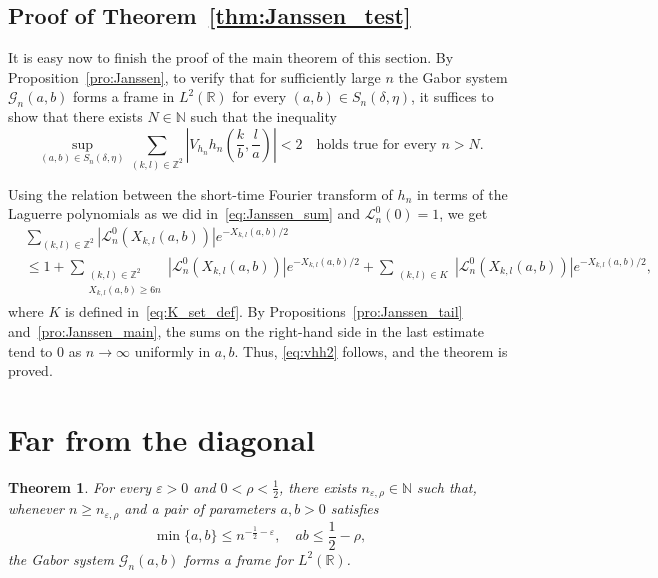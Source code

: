 \documentclass[11pt]{amsart}
\numberwithin{equation}{section}
\newtheorem{theorem}{Theorem}[section]
\newcommand{\R}{{\mathbb R}}
\newcommand{\Z}{{\mathbb Z}}
\newcommand{\N}{{\mathbb N}}
\begin{document}
\subsection{Proof of Theorem~\ref{thm:Janssen_test}}

It is easy now to finish the proof of the main theorem of this section.
By Proposition~\ref{pro:Janssen}, to verify that for sufficiently large $n$ the Gabor system $\mathcal{G}_n(a,b)$ forms a frame in $L^2(\R)$ for every $(a,b) \in S_n(\delta,\eta)$, it suffices to show that there exists $N\in\N$ such that the inequality
\begin{equation}\label{eq:vhh2}
    \sup\limits_{(a,b)\in S_n(\delta, \eta)} \sum_{(k,l)\in \Z^2} \left|V_{h_n} h_n \left( \frac{k}{b},\frac{l}{a} \right) \right| < 2 \quad \text{holds true for every $n>N$.}
\end{equation}

Using the relation between the short-time Fourier transform of $h_n$ in terms of the Laguerre polynomials as we did in~\eqref{eq:Janssen_sum} and $\mathcal{L}^0_n(0)=1$, we get 
\begin{equation}
 \begin{split}
    &\sum_{(k,l)\in \Z^2} \left|\mathcal L^0_n\left(X_{k,l}(a,b)\right)\right|
    e^{-X_{k,l}(a,b)/2} \\
    &\leq
    1+   \sum_{\substack{(k,l)\in\Z^2\\X_{k,l}(a,b)\geq 6n}}
         \left|\mathcal L^0_n\left(X_{k,l}(a,b)\right)\right| e^{-X_{k,l}(a,b)/2}
         +         \sum_{\substack{(k,l)\in K}}
         \left|\mathcal L^0_n\left(X_{k,l}(a,b)\right)\right| e^{-X_{k,l}(a,b)/2},
         \end{split}
\end{equation}
where $K$ is defined in~\eqref{eq:K_set_def}.
By Propositions~\ref{pro:Janssen_tail} and~\ref{pro:Janssen_main}, the sums on the right-hand side in the last estimate tend to $0$ as $n \to \infty$ uniformly in $a,b$.
Thus, \eqref{eq:vhh2} follows, and the theorem is proved.

\section{Far from the diagonal}

\begin{theorem}\label{thm:Wirtinger_test}
    For every $\varepsilon>0$ and $0<\rho<\frac{1}{2}$, there exists $n_{\varepsilon, \rho} \in \N$ such that, whenever $n\geq n_{\varepsilon, \rho}$ and a pair of parameters $a,b>0$ satisfies
    \begin{equation}\label{eq:ab_far}
        \min\{a,b\} \leq n^{-\frac{1}{2}- \varepsilon}, \quad ab \leq \frac{1}{2}-\rho,
    \end{equation}
     the Gabor system $\mathcal{G}_n(a,b)$ forms a frame for $L^2(\R)$.
\end{theorem}
\end{document}
